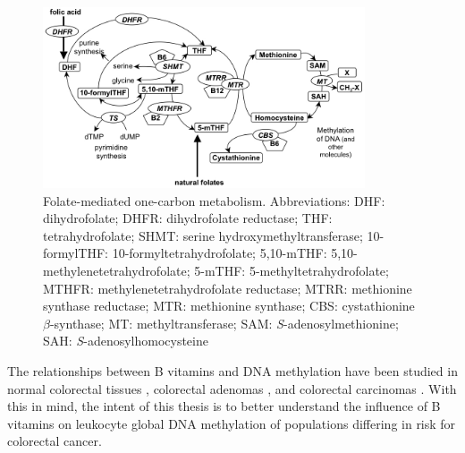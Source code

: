 \begin{figure}[h]
\centering 
\includegraphics[width=0.85\textwidth]{ocm_xls5.jpg} 
\caption{Folate-mediated one-carbon metabolism. Abbreviations: DHF: dihydrofolate; DHFR: dihydrofolate reductase; THF: tetrahydrofolate; SHMT: serine hydroxymethyltransferase; 10-formylTHF: 10-formyltetrahydrofolate; 5,10-mTHF: 5,10-methylenetetrahydrofolate; 5-mTHF: 5-methyltetrahydrofolate; MTHFR: methylenetetrahydrofolate reductase; MTRR: methionine synthase reductase; MTR: methionine synthase; CBS: cystathionine $\beta$-synthase; MT: methyltransferase; SAM: \emph{S}-adenosylmethionine; SAH: \emph{S}-adenosylhomocysteine} 
\label{focm} 
\end{figure}
 
\noindent The relationships between B vitamins and DNA methylation have been studied in normal colorectal tissues \cite{c1104,c1105}, colorectal adenomas \cite{c1106}, and colorectal carcinomas \cite{c1107,c1108}. With this in mind, the intent of this thesis is to better understand the influence of B vitamins on leukocyte global DNA methylation of populations differing in risk for colorectal cancer. 
 
